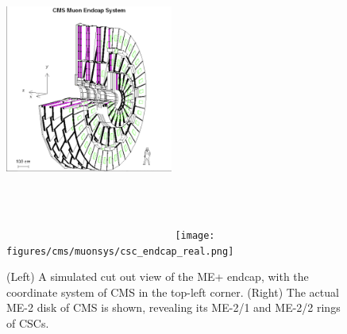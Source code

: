 \begin{figure}[pbth]
    \centering
    \includegraphics[width=0.49\textwidth,height=10cm,keepaspectratio]{figures/cms/muonsys/csc_endcap_cutaway.png}
    \texttt{[image: figures/cms/muonsys/csc\_endcap\_real.png]}
        \caption{
        (Left) A simulated cut out view of the ME+ endcap, with the coordinate system of CMS in the top-left corner.
        (Right) The actual ME-2 disk of CMS is shown, revealing its ME-2/1 and ME-2/2 rings of CSCs.
        }
        \label{fig:cms_endcap}
    \end{figure}

